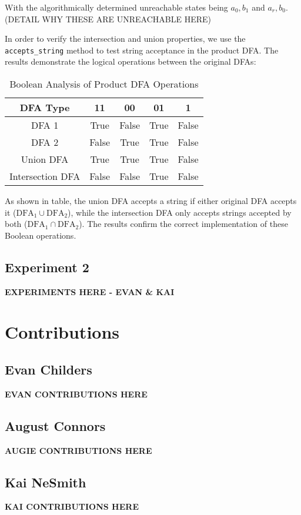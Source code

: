 \documentclass[conference]{IEEEtran}
\begin{document}
With the algorithmically determined unreachable states being $a_0,b_1$ and $a_r,b_0$.\\ (DETAIL WHY THESE ARE UNREACHABLE HERE)

In order to verify the intersection and union properties, we use the \texttt{accepts\_string} method to test string acceptance in the product DFA. The results demonstrate the logical operations between the original DFAs:

\begin{table}[h!]
\centering
\caption{Boolean Analysis of Product DFA Operations}
\label{table:dfa_boolean}
\begin{tabular}{|c|c|c|c|c|}
\hline
\textbf{DFA Type} & \textbf{11} & \textbf{00} & \textbf{01} & \textbf{1} \\ \hline
DFA 1 & True & False & True & False \\ \hline
DFA 2 & False & True & True & False \\ \hline
Union DFA & True & True & True & False \\ \hline
Intersection DFA & False & False & True & False \\ \hline
\end{tabular}
\end{table} 

As shown in table, the union DFA accepts a string if either original DFA accepts it ($\text{DFA}_1 \cup \text{DFA}_2$), while the intersection DFA only accepts strings accepted by both ($\text{DFA}_1 \cap \text{DFA}_2$). The results confirm the correct implementation of these Boolean operations.


\subsection{Experiment 2}


\textbf{EXPERIMENTS HERE - EVAN \& KAI}

\section{Contributions}
\subsection{Evan Childers}
\textbf{EVAN CONTRIBUTIONS HERE}
\subsection{August Connors}
\textbf{AUGIE CONTRIBUTIONS HERE}
\subsection{Kai NeSmith}
\textbf{KAI CONTRIBUTIONS HERE}
\end{document}
